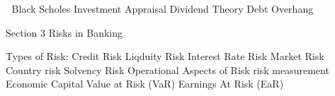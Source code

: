 

Black Scholes
Investment Appraisal
Dividend Theory
Debt Overhang

Section 3 Risks in Banking

Types of Risk:
Credit Risk
Liqduity Risk
Interest Rate Risk
Market Risk
Country risk
Solvency Risk
Operational Aspects of Risk
risk measurement
Economic Capital
Value at Risk (VaR)
Earnings At Risk (EaR)
